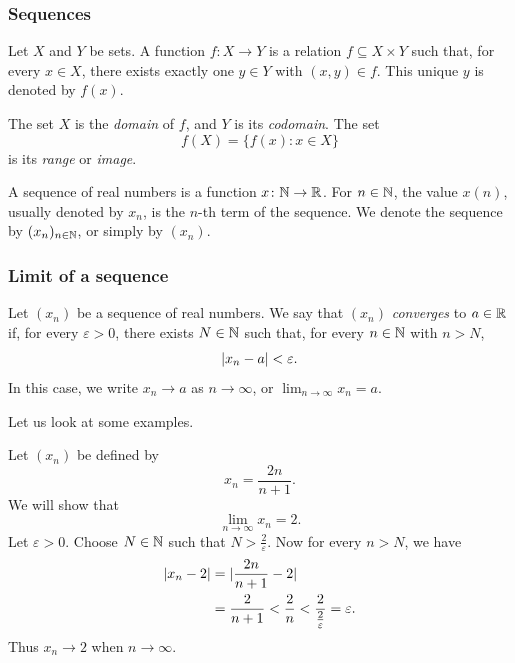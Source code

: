 \documentclass[11pt,a4paper]{amsart}
\begin{document}
\subsubsection{Sequences}

\begin{definition}
  Let \(X\) and \(Y\) be sets. A function \(f\colon X\to Y\) is a relation
  \(f\subseteq X\times Y\) such that, for every \(x\in X\), there exists
  exactly one \(y\in Y\) with \((x,y)\in f\). This unique \(y\) is denoted
  by \(f(x)\).

  The set \(X\) is the \emph{domain} of \(f\), and \(Y\) is its
  \emph{codomain}. The set
  \[
    f(X)=\{f(x):x\in X\}
  \]
  is its \emph{range} or \emph{image}.
\end{definition}

\begin{definition}
  A sequence of real numbers is a function \(x\colon\mathbb{N}\to\mathbb{R}\).
  For \(n\in\mathbb{N}\), the value \(x(n)\), usually denoted by \(x_n\), is the
  \(n\)-th term of the sequence. We denote the sequence by
  \((x_n)_{n\in\mathbb{N}}\), or simply by \((x_n)\).
\end{definition}

\subsubsection{Limit of a sequence}

\begin{definition}
  Let \((x_n)\) be a sequence of real numbers. We say that \((x_n)\)
  \emph{converges} to \(a\in\mathbb{R}\) if, for every \(\varepsilon>0\), there
  exists \(N\in\mathbb{N}\) such that, for every \(n\in\mathbb{N}\) with \(n > N\),
  \[
    \lvert x_n-a\rvert<\varepsilon.
  \]
  In this case, we write \(x_n\to a\) as \(n\to\infty\), or
  \(\lim_{n\to\infty}x_n=a\).
\end{definition}

Let us look at some examples.

\begin{example}
  Let \((x_n)\) be defined by
  \[
    x_n = \frac{2n}{n + 1}.
  \]
  We will show that
  \[
    \lim_{n \to \infty} x_n = 2.
  \]
  Let \(\varepsilon > 0\). Choose \(N \in \mathbb{N}\) such that
  \(N > \frac{2}{\varepsilon}\). Now for every \(n > N\), we have
  \[
    \begin{aligned}
      \lvert x_n - 2\rvert &= \lvert\frac{2n}{n + 1} - 2\rvert \\
      &= \frac{2}{n + 1} < \frac{2}{n} < \frac{2}{\frac{2}{\varepsilon}}
      = \varepsilon.
    \end{aligned}
  \]
  Thus \(x_n \to 2\) when \(n \to \infty\).
\end{example}
\end{document}
